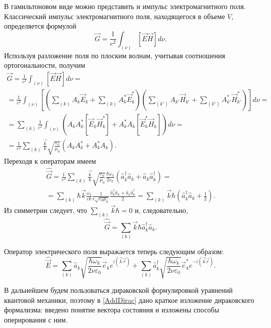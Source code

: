 В гамильтоновом виде можно представить и импульс электромагнитного 
поля. Классический импульс электромагнитного поля, находящегося в
объеме  $V$,  определяется формулой 
\begin{equation}
\vec{G} = \frac{1}{c^2} \int_{(\nu)}
\left[\vec{E} \vec{H} \right] d \nu.
\label{eqCh1_task3_1}
\end{equation}
Используя разложение поля по плоским волнам, учитывая соотношения
ортогональности, получим
\begin{eqnarray}
  \vec{G} = \frac{1}{c^2} \int_{(\nu)}
  \left[\vec{E} \vec{H} \right] d \nu =
  \nonumber \\
  =
  \frac{1}{c^2} \int_{(\nu)}
  \left[
    \left(\sum_{(k)} A_k \vec{E}_k +
    \sum_{(k)} A_k^\ast \vec{E}_k^\ast \right)
    \left(\sum_{(k')} A_{k'} \vec{H}_{k'} +
    \sum_{(k')} A_{k'}^\ast \vec{H}_{k'}^\ast \right)\right]
  d \nu =
  \nonumber \\
  =
  \sum_{(k)}
  \frac{1}{c^2} \int_{(\nu)}
  \left(
  A_k A_k^\ast \left[\vec{E}_k \vec{H}_k^\ast \right]
  +
  A_k^\ast A_k \left[\vec{E}_k^\ast \vec{H}_k \right]
  \right)
  d \nu =
  \nonumber \\
  =
  \frac{1}{c^2} \sum_{(k)} \frac{\vec{k}}{k}
  \sqrt{\frac{\varepsilon_0}{\mu_0}}
  \left(
  A_k A_k^\ast + A_k^\ast A_k
  \right).
  \nonumber
\end{eqnarray}
Переходя к операторам имеем
\begin{eqnarray}
  \hat{\vec{G}} =
  \frac{1}{c^2} \sum_{(k)} \frac{\vec{k}}{k}
  \sqrt{\frac{\varepsilon_0}{\mu_0}}
  \frac{\hbar \omega_k}{2 \varepsilon_0}
  \left(\hat{a}_k^{\dag} \hat{a}_k + \hat{a}_k \hat{a}_k^{\dag}\right)
  =
  \nonumber \\
  =
  \sum_{(k)}
  \hbar
  \vec{k}
  \frac{\omega_k}{c k}
  \frac{1}{c \sqrt{\varepsilon_0 \mu_0}}
  \frac{\hat{a}_k^{\dag} \hat{a}_k + \hat{a}_k \hat{a}_k^{\dag}}{2}
  =
  \sum_{(k)} \vec{k} \hbar\left( \hat{a}_k^{\dag} \hat{a}_k +
\frac{1}{2} \right).
\nonumber
\end{eqnarray}
Из симметрии  следует, что $\sum_{(k)} \vec{k} \hbar = 0$ и, следовательно, 
\begin{equation}
\hat{\vec{G}} = \sum_{(k)} \vec{k} \hbar\hat{a}_k^{\dag} \hat{a}_k.
\label{eqCh1_task3_2}
\end{equation}

Оператор электрического поля выражается теперь следующим образом:
\begin{equation}
\hat{\vec{E}} = \sum_{(k)} \hat{a}_k\sqrt{\frac{\hbar \omega_k}{2 \nu
    \varepsilon_0}} \vec{e}_k e^{i\left(\vec{k}\vec{r}\right)} +
\sum_{(k)} \hat{a}_k^{\dag}\sqrt{\frac{\hbar \omega_k}{2 \nu
    \varepsilon_0}} \vec{e}_k^{*} e^{-i\left(\vec{k}\vec{r}\right)}.
\end{equation}

В дальнейшем будем пользоваться дираковской формулировкой уравнений
квантовой механики, поэтому в \autoref{AddDirac} дано краткое
изложение дираковского формализма: введено понятие вектора состояния и
изложены способы оперирования с ним.  
